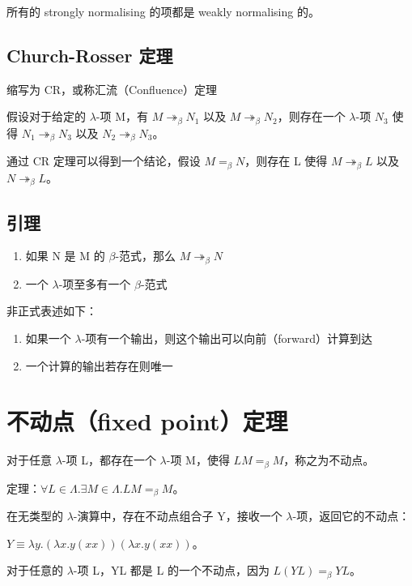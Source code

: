 \documentclass[UTF8]{article}
\begin{document}
	所有的 strongly normalising 的项都是 weakly normalising 的。

\subsection{Church-Rosser 定理}

	缩写为 CR，或称汇流（Confluence）定理

	假设对于给定的 $\lambda$-项 M，有 $M \twoheadrightarrow_\beta N_1$ 以及 $M \twoheadrightarrow_\beta N_2$，则存在一个 $\lambda$-项 $N_3$ 使得 $N_1 \twoheadrightarrow_\beta N_3$ 以及 $N_2 \twoheadrightarrow_\beta N_3$。

	通过 CR 定理可以得到一个结论，假设 $M =_\beta N$，则存在 L 使得 $M \twoheadrightarrow_\beta L$ 以及 $N \twoheadrightarrow_\beta L$。

\subsection{引理}

	\begin{enumerate}
		\item 如果 N 是 M 的 $\beta$-范式，那么 $M \twoheadrightarrow_\beta N$
		\item 一个 $\lambda$-项至多有一个 $\beta$-范式
	\end{enumerate}

	非正式表述如下：
	\begin{enumerate}
		\item 如果一个 $\lambda$-项有一个输出，则这个输出可以向前（forward）计算到达
		\item 一个计算的输出若存在则唯一
	\end{enumerate}

\section{不动点（fixed point）定理}

	对于任意 $\lambda$-项 L，都存在一个 $\lambda$-项 M，使得 $LM =_\beta M$，称之为不动点。

	定理：$\forall L \in \Lambda. \exists M \in \Lambda. LM =_\beta M$。

	在无类型的 $\lambda$-演算中，存在不动点组合子 Y，接收一个 $\lambda$-项，返回它的不动点：

	$Y\equiv \lambda y.(\lambda x.y(xx))(\lambda x.y(xx))$。

	对于任意的 $\lambda$-项 L，YL 都是 L 的一个不动点，因为 $L(YL) =_\beta YL$。
\end{document}
